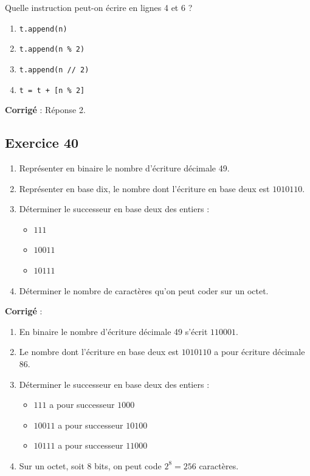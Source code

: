 \documentclass[11pt]{article}
\providecommand{\tightlist}{%
      \setlength{\itemsep}{0pt}\setlength{\parskip}{0pt}}
\begin{document}
Quelle instruction peut-on écrire en lignes 4 et 6 ?

\begin{enumerate}
\def\labelenumi{\arabic{enumi}.}
\tightlist
\item
  \texttt{t.append(n)}
\item
  \texttt{t.append(n\ \%\ 2)}
\item
  \texttt{t.append(n\ //\ 2)}
\item
  \texttt{t\ =\ t\ +\ {[}n\ \%\ 2{]}}
\end{enumerate}

    \textbf{Corrigé} : Réponse 2.

    \hypertarget{exercice-40}{%
\subsection{Exercice 40}\label{exercice-40}}

\begin{enumerate}
\def\labelenumi{\arabic{enumi}.}
\tightlist
\item
  Représenter en binaire le nombre d'écriture décimale 49.
\item
  Représenter en base dix, le nombre dont l'écriture en base deux est
  \(1010110\).
\item
  Déterminer le successeur en base deux des entiers :

  \begin{itemize}
  \tightlist
  \item
    \(111\)
  \item
    \(10011\)
  \item
    \(10111\)
  \end{itemize}
\item
  Déterminer le nombre de caractères qu'on peut coder sur un octet.
\end{enumerate}

    \textbf{Corrigé} :

\begin{enumerate}
\def\labelenumi{\arabic{enumi}.}
\tightlist
\item
  En binaire le nombre d'écriture décimale 49 s'écrit \(110001\).
\item
  Le nombre dont l'écriture en base deux est \(1010110\) a pour écriture
  décimale \(86\).
\item
  Déterminer le successeur en base deux des entiers :

  \begin{itemize}
  \tightlist
  \item
    \(111\) a pour successeur \(1000\)
  \item
    \(10011\) a pour successeur \(10100\)
  \item
    \(10111\) a pour successeur \(11000\)
  \end{itemize}
\item
  Sur un octet, soit \(8\) bits, on peut code \(2^{8}=256\) caractères.
\end{enumerate}
\end{document}
